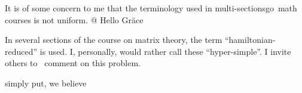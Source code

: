 \documentclass{sample}
\begin{document}
It is of some concern to me     that
the terminology used in multi-sectionsgo~math courses is not uniform.
@
Hello Gr\"{a}ce

 In several sections of the course on
 matrix theory, the term
    ``hamiltonian-reduced'' is used.
    I, personally, would rather call these
   ``hyper-simple''. I invite others
to \ comment on this problem.

simply put, we believe %
   
\end{document}
